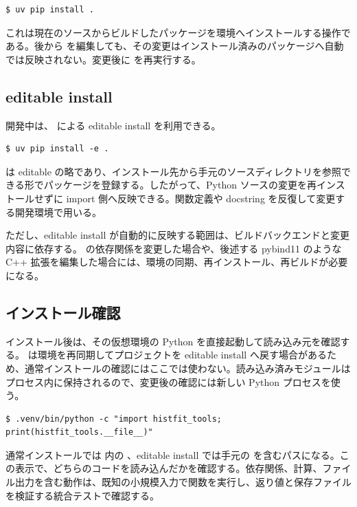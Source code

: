 \begin{lstlisting}[numbers=none, xleftmargin=2\zw]
$ uv pip install .
\end{lstlisting}

これは現在のソースからビルドしたパッケージを環境へインストールする操作である。後から  を編集しても、その変更はインストール済みのパッケージへ自動では反映されない。変更後に  を再実行する。

\subsection{editable install}

開発中は、 による editable install を利用できる。

\begin{lstlisting}[numbers=none, xleftmargin=2\zw]
$ uv pip install -e .
\end{lstlisting}

 は editable の略であり、インストール先から手元のソースディレクトリを参照できる形でパッケージを登録する。したがって、Python ソースの変更を再インストールせずに import 側へ反映できる。関数定義や docstring を反復して変更する開発環境で用いる。

ただし、editable install が自動的に反映する範囲は、ビルドバックエンドと変更内容に依存する。 の依存関係を変更した場合や、後述する pybind11 のような C++ 拡張を編集した場合には、環境の同期、再インストール、再ビルドが必要になる。

\subsection{インストール確認}

インストール後は、その仮想環境の Python を直接起動して読み込み元を確認する。 は環境を再同期してプロジェクトを editable install へ戻す場合があるため、通常インストールの確認にはここでは使わない。読み込み済みモジュールはプロセス内に保持されるので、変更後の確認には新しい Python プロセスを使う。

\begin{lstlisting}[numbers=none, xleftmargin=2\zw]
$ .venv/bin/python -c "import histfit_tools; print(histfit_tools.__file__)"
\end{lstlisting}

通常インストールでは  内の 、editable install では手元の  を含むパスになる。この表示で、どちらのコードを読み込んだかを確認する。依存関係、計算、ファイル出力を含む動作は、既知の小規模入力で関数を実行し、返り値と保存ファイルを検証する統合テストで確認する。

